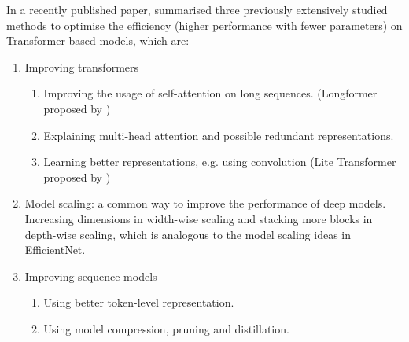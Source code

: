 In a recently published paper, \citet{mehta2020delight} summarised three previously extensively studied methods to optimise the efficiency (higher performance with fewer parameters) on Transformer-based models, which are:

\begin{enumerate}
    \item Improving transformers
    \begin{enumerate}
        \item Improving the usage of self-attention on long sequences. (Longformer proposed by \citet{beltagy2020longformer})
        \item Explaining multi-head attention and possible redundant representations.
        \item Learning better representations, e.g. using convolution (Lite Transformer proposed by \citet{wu2020lite})
    \end{enumerate}
    \item Model scaling: a common way to improve the performance of deep models. \\
    Increasing dimensions in width-wise scaling and stacking more blocks in depth-wise scaling, which is analogous to the model scaling ideas in EfficientNet.
    \item Improving sequence models
    \begin{enumerate}
        \item Using better token-level representation.
        \item Using model compression, pruning and distillation.
    \end{enumerate}
\end{enumerate}
